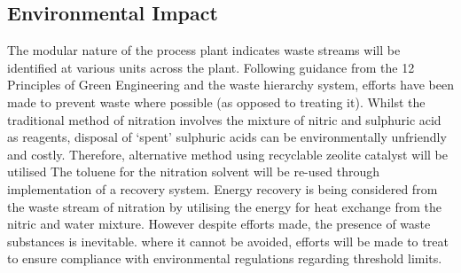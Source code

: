 

\subsection{Environmental Impact}

The modular nature of the process plant indicates waste streams will be identified at various units across the plant. Following guidance from the 12 Principles of Green Engineering and the waste hierarchy system, efforts have been made to prevent waste where possible (as opposed to treating it). Whilst the traditional method of nitration involves the mixture of nitric and sulphuric acid as reagents, disposal of ‘spent’ sulphuric acids can be environmentally unfriendly and costly. Therefore, alternative method using recyclable zeolite catalyst will be utilised %
The toluene for the nitration solvent will be re-used through implementation of a recovery system. Energy recovery is being considered from the waste stream of nitration by utilising the energy for heat exchange from the nitric and water mixture. However despite efforts made, the presence of waste substances is inevitable.  where it cannot be avoided, efforts will be made to treat to ensure compliance with environmental regulations regarding threshold limits. 